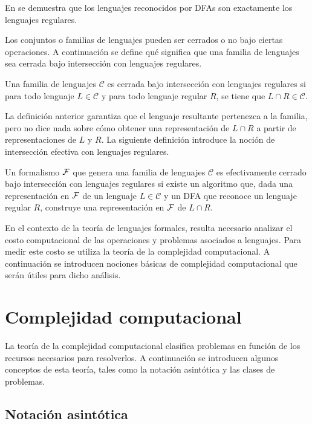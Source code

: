 En \cite{automataTheory} se demuestra que los lenguajes reconocidos por DFAs son exactamente los lenguajes regulares.

Los conjuntos o familias de lenguajes pueden ser cerrados o no bajo ciertas operaciones. A continuación se define qué significa que una familia de lenguajes sea cerrada bajo intersección con lenguajes regulares.

\begin{definition}
	Una familia de lenguajes $\mathcal{C}$ es cerrada bajo intersección con lenguajes regulares si para todo lenguaje $L \in \mathcal{C}$ y para todo lenguaje regular $R$, se tiene que $L \cap R \in \mathcal{C}$.
\end{definition}

La definición anterior garantiza que el lenguaje resultante pertenezca a la familia, pero no dice nada sobre cómo obtener una representación de $L \cap R$ a partir de representaciones de $L$ y $R$. La siguiente definición introduce la noción de intersección efectiva con lenguajes regulares.

\begin{definition}
	Un formalismo $\mathcal{F}$ que genera una familia de lenguajes $\mathcal{C}$ es efectivamente cerrado bajo intersección con lenguajes regulares si existe un algoritmo que, dada una representación en $\mathcal{F}$ de un lenguaje $L \in \mathcal{C}$ y un DFA que reconoce un lenguaje regular $R$, construye una representación en $\mathcal{F}$ de $L \cap R$.
\end{definition}

En el contexto de la teoría de lenguajes formales, resulta necesario analizar el costo computacional de las operaciones y problemas asociados a lenguajes. Para medir este costo se utiliza la teoría de la complejidad computacional. A continuación se introducen nociones básicas de complejidad computacional que serán útiles para dicho análisis.

\section{Complejidad computacional}
La teoría de la complejidad computacional clasifica problemas en función de los recursos necesarios para resolverlos. A continuación se introducen algunos conceptos de esta teoría, tales como la notación asintótica y las clases de problemas.

\subsection{Notación asintótica}

